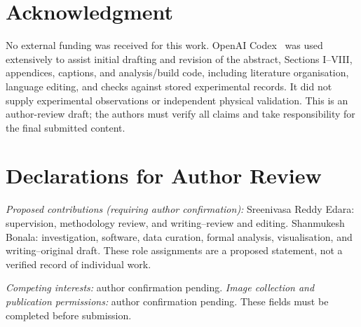 \section*{Acknowledgment}
No external funding was received for this work. OpenAI Codex~\cite{codex} was used extensively to assist initial drafting and revision of the abstract, Sections I--VIII, appendices, captions, and analysis/build code, including literature organisation, language editing, and checks against stored experimental records. It did not supply experimental observations or independent physical validation. This is an author-review draft; the authors must verify all claims and take responsibility for the final submitted content.

\section*{Declarations for Author Review}
\textit{Proposed contributions (requiring author confirmation):} Sreenivasa Reddy Edara: supervision, methodology review, and writing--review and editing. Shanmukesh Bonala: investigation, software, data curation, formal analysis, visualisation, and writing--original draft. These role assignments are a proposed statement, not a verified record of individual work.

\textit{Competing interests:} author confirmation pending. \textit{Image collection and publication permissions:} author confirmation pending. These fields must be completed before submission.
